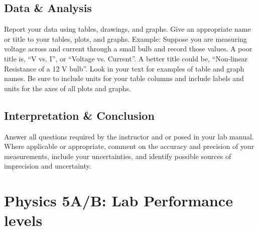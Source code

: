 \section{Data \& Analysis}
Report your data using tables, drawings, and graphs. Give an appropriate name or title to your tables, plots, and graphs. Example: Suppose you are measuring voltage across and current through a small bulb and record those values. A   poor title is, ``V vs. I'', or ``Voltage vs. Current''. A better title could be, ``Non-linear Resistance of a 12 V bulb''. Look in your text for examples of table and graph names. Be sure to include units for your table columns and include labels and units for the axes of all plots and graphs.

\section{Interpretation \& Conclusion}
Answer all questions required by the instructor and or posed in your lab manual. Where applicable or appropriate, comment on the accuracy and precision of your measurements, include your uncertainties, and identify possible sources of imprecision and uncertainty.

\chapter{Physics 5A/B: Lab Performance levels}
